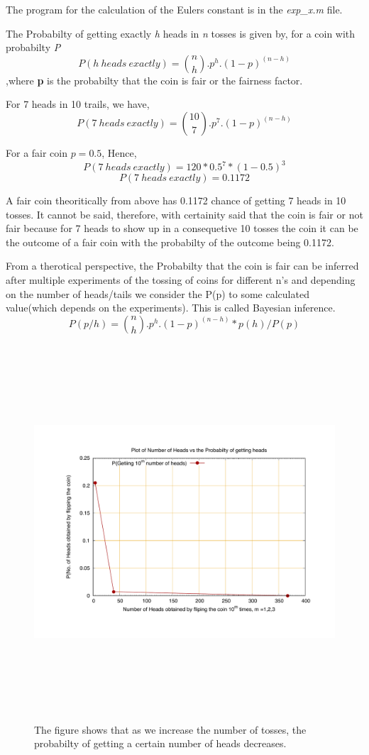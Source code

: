 \documentclass[fleqn,letterpaper,12pt]{report}
\begin{document}
The program for the calculation of the Eulers constant is in the {\em exp\_x.m} file.
%

\newpage
{}
{}
\problem
The Probabilty of getting exactly {\em h} heads in {\em n} tosses is given by, for a coin with probabilty {\em  P} 
$$ P(h\ heads\ exactly) = \binom{n}{h}.p^h.(1-p)^{(n-h)} $$
,where {\bf p} is the probabilty that the coin is fair or the fairness factor. 

For 7 heads in 10 trails, we have,
$$ P(7\ heads\ exactly) = \binom{10}{7}.p^7.(1-p)^{(n-h)} $$

For a fair coin $ p=0.5$, Hence,
$$ P(7\ heads\ exactly) = 120*0.5^7*(1-0.5)^3 $$
$$ P(7\ heads\ exactly) = 0.1172 $$

A fair coin theoritically from above has 0.1172 chance of getting 7 heads in 10 tosses. It cannot be said, therefore, with certainity said that the coin is fair or not fair because for 7 heads to show up in a consequetive 10 tosses the coin it can be the outcome of a fair coin with the probabilty of the outcome being 0.1172. 

From a therotical perspective, the Probabilty that the coin is fair can be inferred after multiple experiments of the tossing of coins for different n's and depending on the number of heads/tails we consider the P(p) to some calculated value(which depends on the experiments). This is called Bayesian inference.  
$$ P(p/h) = {{\binom{n}{h}.p^h.(1-p)^{(n-h)}}*p(h)}/P(p) $$
\clearpage
\begin{figure}[ht!]
	\centering
	\includegraphics[height=140mm,width=140mm]{CoinFlip_single.pdf}\caption{The figure shows that as we increase the number of tosses, the probabilty of getting a certain number of heads decreases. 
 \label{overflow}}
\end{figure}
\clearpage
\end{document}
